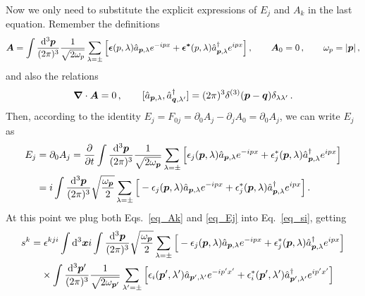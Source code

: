 \begin{sol}
\begin{equation}
    \end{equation}
    Now we only need to substitute the explicit expressions of $E_{j}$ and $A_{k}$ in the last equation. Remember the definitions
    \begin{equation}
    \label{eq_Ak}
        \boldsymbol{A} = \int \frac{{\rm d}^3\boldsymbol{p}}{(2\pi)^{3}}\frac{1}{\sqrt{2\omega_{p}}}\sum_{\lambda=\pm}\Big[\boldsymbol{\epsilon}(p, \lambda)\hat{a}_{\boldsymbol{p}, \lambda}e^{-ipx} + \boldsymbol{\epsilon^{*}}(p, \lambda)\hat{a}^\dagger_{\boldsymbol{p}, \lambda}e^{ipx} \Big] \,,
        \qquad
        \boldsymbol{A}_{0} = 0 \,,
        \qquad
        \omega_{p} = |\boldsymbol{p}|\, ,
    \end{equation}
    and also the relations 
    \begin{equation}
        \boldsymbol{\nabla} \cdot \boldsymbol{A} = 0 \,,
        \qquad
        [\hat{a}_{\boldsymbol{p},\lambda}, \hat{a}^\dagger_{\boldsymbol{q}, \lambda'}] = (2\pi)^{3}\delta^{(3)}(\boldsymbol{p}-\boldsymbol{q})\delta_{\lambda \lambda'}\, .
    \end{equation}
    Then, according to the identity $E_{j} = F_{0j} = \partial_{0}A_{j} - \partial_{j}A_{0} = \partial_{0}A_{j}$, we can write $E_j$ as
    \begin{equation}
    \label{eq_Ej}
        \begin{split}
            E_{j} &= \partial_{0}A_{j} = \frac{\partial}{\partial t} \int \frac{{\rm d}^3\boldsymbol{p}}{(2\pi)^{3}}\frac{1}{\sqrt{2\omega_{\boldsymbol{p}}}}\sum_{\lambda=\pm}\Big[\epsilon_{j}(\boldsymbol{p}, \lambda)\hat{a}_{\boldsymbol{p}, \lambda}e^{-ipx} + \epsilon^*_{j}(\boldsymbol{p}, \lambda)\hat{a}^\dagger_{\boldsymbol{p}, \lambda}e^{ipx} \Big] \\
            &= i\int \frac{{\rm d}^3\boldsymbol{p}}{(2\pi)^{3}}\sqrt{\frac{\omega_{\boldsymbol{p}}}{2}}\sum_{\lambda=\pm}\Big[-\epsilon_{j}(\boldsymbol{p}, \lambda)\hat{a}_{\boldsymbol{p}, \lambda}e^{-ipx} + \epsilon^*_{j}(\boldsymbol{p}, \lambda)\hat{a}^\dagger_{\boldsymbol{p}, \lambda}e^{ipx} \Big]\,.
        \end{split}
    \end{equation}
    At this point we plug both Eqs.~\eqref{eq_Ak} and \eqref{eq_Ej} into Eq.~\eqref{eq_si}, getting
    \begin{equation}
    \label{eq_semifinalsk}
    \begin{split}
            s^{k} = &\; \epsilon^{kji} \int \rmd^3\vx i \int \frac{\rmd^3\vp}{(2\pi)^{3}}\sqrt{\frac{\omega_{\vp}}{2}}\sum_{\lambda=\pm}\Big[-\epsilon_{j}(\vp, \lambda)\ades_{\vp, \lambda}e^{-ipx} + \epsilon^*_{j}(\vp, \lambda)\acon_{\vp, \lambda}e^{ipx} \Big] \\
            &\times \int \frac{\rmd^3\vp'}{(2\pi)^{3}}\frac{1}{\sqrt{2\omega_{\vp'}}}\sum_{\lambda'=\pm}\Big[\epsilon_{i}(\vp', \lambda')\ades_{\vp', \lambda'}e^{-ip'x'} + \epsilon^*_{i}(\vp', \lambda')\acon_{\vp', \lambda'}e^{ip'x'} \Big] \\

\end{split}
\end{equation}
\end{sol}
